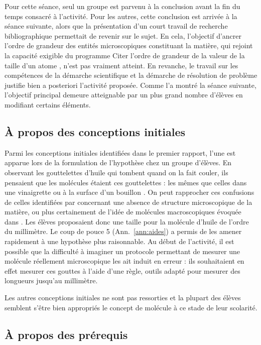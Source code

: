\documentclass[12pt,a4paper, fleqn]{report}
\begin{document}
Pour cette séance, seul un groupe est parvenu à la conclusion avant la fin du temps consacré à l'activité.
Pour les autres, cette conclusion est arrivée à la séance suivante, alors que la présentation d'un court travail de recherche bibliographique permettait de revenir sur le sujet.
En cela, l'objectif d'ancrer l'ordre de grandeur des entités microscopiques constituant la matière, qui rejoint la capacité exigible du programme \og Citer l'ordre de grandeur de la valeur de la taille d'un atome \fg{}, n'est pas vraiment atteint.
En revanche, le travail sur les compétences de la démarche scientifique et la démarche de résolution de problème justifie bien a posteriori l'activité proposée.
Comme l'a montré la séance suivante, l'objectif principal demeure atteignable par un plus grand nombre d'élèves en modifiant certains éléments.

\subsection{À propos des conceptions initiales}

Parmi les conceptions initiales identifiées dans le premier rapport, l'une est apparue lors de la formulation de l'hypothèse chez un groupe d'élèves.
En observant les gouttelettes d'huile qui tombent quand on la fait couler, ils pensaient que les molécules étaient ces gouttelettes : \og les mêmes que celles dans une vinaigrette ou à la surface d'un bouillon \fg{}.
On peut rapprocher ces confusions de celles identifiées par \cite{Bain1985} concernant une absence de structure microscopique de la matière, ou plus certainement de l'idée de molécules macroscopiques évoquée dans \cite{Griffiths1992}.
Les élèves proposaient donc une taille pour la molécule d'huile de l'ordre du millimètre.
Le coup de pouce 5 (Ann.~\ref{ann:aides}) a permis de les amener rapidement à une hypothèse plus raisonnable.
Au début de l'activité, il est possible que la difficulté à imaginer un protocole permettant de mesurer une molécule réellement microscopique les ait induit en erreur : ils souhaitaient en effet mesurer ces gouttes à l'aide d'une règle, outils adapté pour mesurer des longueurs jusqu'au millimètre.

Les autres conceptions initiales ne sont pas ressorties et la plupart des élèves semblent s'être bien appropriés le concept de molécule à ce stade de leur scolarité.

\subsection{À propos des prérequis}
\end{document}
